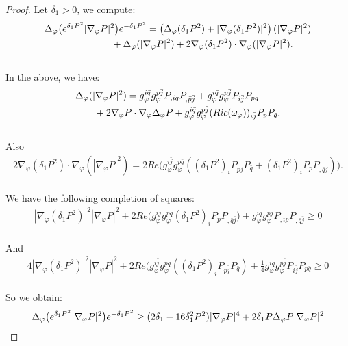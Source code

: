 \documentclass[11pt]{amsart}
\numberwithin{equation}{section}
\begin{document}
\begin{proof}
Let $\delta_1>0$,  we compute:
\begin{align}
	& \Delta_{\varphi}\big(e^{\delta_1P^2}|\nabla_{\varphi}P|^2\big)e^{-\delta_1P^2} =\left( \Delta_{\varphi}(\delta_1P^2)+|\nabla_{\varphi}(\delta_1P^2)|^2 \right)(|\nabla_\varphi P|^2)  \notag \\
	&\qquad\qquad\qquad \quad +\Delta_{\varphi}(|\nabla_{\varphi}P|^2) +2\nabla_{\varphi}(\delta_1P^2)\cdot \nabla_{\varphi}(|\nabla_{\varphi}P|^2).
\end{align}\\
In the above,  we have:
\begin{align}
	& \Delta_{\varphi}(|\nabla_{\varphi}P|^2)=g_{\varphi}^{i\bar{q}}g_{\varphi}^{p\bar{j}}P_{,iq}P_{,\bar{p}\bar{j}}+g_{\varphi}^{i\bar{q}}g_{\varphi}^{p\bar{j}}P_{i\bar{j}}P_{p\bar{q}} \notag\\
	&\qquad +2\nabla_{\varphi}P\cdot \nabla_{\varphi}\Delta_{\varphi}P+g_{\varphi}^{i\bar{q}}g_{\varphi}^{p\bar{j}}(Ric(\omega_{\varphi}))_{i\bar{j}}P_pP_{\bar{q}}.
\end{align}\\
Also
\begin{align}
2\nabla_{\varphi}(\delta_1P^2)\cdot \nabla_{\varphi}(|\nabla_{\varphi}P|^2)=2Re\big(g_{\varphi}^{i\bar{j}}g_{\varphi}^{p\bar{q}}((\delta_1P^2)_iP_{p\bar{j}}P_{\bar{q}}+(\delta_1P^2)_iP_pP_{,\bar{q}\bar{j}})\big).
\end{align}\\
We have the following completion of squares:
\begin{align}
|\nabla_{\varphi}(\delta_1P^2)|^2 |\nabla_\varphi P|^2 +2Re\big(g_{\varphi}^{i\bar{j}}g_{\varphi}^{p\bar{q}}(\delta_1P^2)_iP_pP_{,\bar{q}\bar{j}}\big)+g_{\varphi}^{i\bar{q}}g_{\varphi}^{p\bar{j}}P_{,ip}P_{,\bar{q}\bar{j}}\ge  0
\end{align}\\
And 
\begin{align}
	4|\nabla_{\varphi}(\delta_1P^2)|^2|\nabla_\varphi P|^2 + 2Re\big(g_{\varphi}^{i\bar{j}}g_{\varphi}^{p\bar{q}}((\delta_1P^2)_iP_{p\bar{j}}P_{\bar{q}}) +\frac{1}{4}g_{\varphi}^{i\bar{q}}g_{\varphi}^{p\bar{j}}P_{i\bar{j}}P_{p\bar{q}}\ge  0
\end{align}\\
So we obtain:
\begin{align}
	&\Delta_{\varphi}\big(e^{\delta_1P^2}|\nabla_{\varphi}P|^2\big)e^{-\delta_1P^2} \ge  (2\delta_1-16\delta_1^2P^2) |\nabla_{\varphi}P|^4 +2\delta_1P\Delta_{\varphi}P|\nabla_{\varphi}P|^2 \notag \\

\end{align}
\end{proof}
\end{document}
